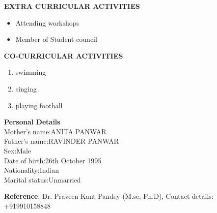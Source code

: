 \documentclass{article}
\begin{document}
\begin{flushleft}
	\vspace{0.2in}
	
		\textbf{EXTRA CURRICULAR ACTIVITIES}
	\begin{itemize}
		\item Attending workshops
	 	\item Member of Student council
	\end{itemize}
\end{flushleft}

\begin{flushleft}
	\vspace{0.2in}
	
		\textbf{CO-CURRICULAR ACTIVITIES}
	\begin{enumerate}
		\item swimming
	 	\item singing
		\item playing football
	\end{enumerate}
\end{flushleft}

\begin{flushleft}
	\vspace{0.4in}
	\textbf{Personal Details}\\
	\hspace{1.5in}Mother's name:\hspace{.08in}ANITA PANWAR\\
	\hspace{1.5in}Father's name:\hspace{.1in}RAVINDER PANWAR\\
	\hspace{1.5in}Sex:\hspace{.75in}Male\\
	\hspace{1.5in}Date of birth:\hspace{.15in}26th October 1995\\
	\hspace{1.5in}Nationality:\hspace{.27in}Indian\\
	\hspace{1.5in}Marital status:\hspace{.09in}Unmarried\\
\end{flushleft}
\begin{flushleft}
	\vspace{0.1in}
	\textbf{Reference}\hspace{0.36in}: Dr. Praveen Kant Pandey (M.sc, Ph.D), Contact details: +919910158848\\
\end{flushleft}
\end{document}
